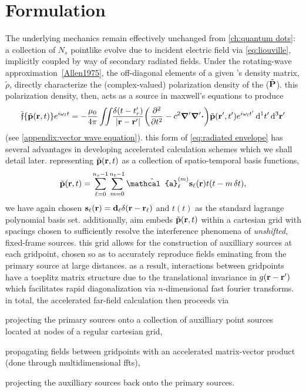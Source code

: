 \section{Formulation}

The underlying mechanics remain effectively unchanged from \cref{ch:quantum dots}: a collection of $N_s$ pointlike \qds{} evolve due to incident electric field via \cref{eq:liouville}, implicitly coupled by way of secondary radiated fields.
Under the rotating-wave approximation~\cref{Allen1975}, the off-diagonal elements of a given \qd's density matrix, $\tilde{\rho}$, directly characterize the (complex-valued) polarization density of the \qd{} ($\tilde{\vb{P}}$).
this polarization density, then, acts as a source in maxwell's equations to produce
\begin{equation}
  \tilde{\mathfrak{f}}\qty{\tilde{\vb{p}}(\vb{r}, t)}e^{i \omega_l t} = -\frac{\mu_0}{4\pi} \iint_{} \kern0.1em \frac{\delta(t - t'_r)}{\abs{\vb{r} - \vb{r}'}} \qty(\pdv[2]{t} - c^2 \grad' \grad'\boldsymbol{\cdot}) \tilde{\vb{p}}(\vb{r}', t') e^{i \omega_l t'} \dd[1]{t'} \dd[3]{\vb{r}'}
  \label{eq:envelope propagator}
\end{equation}
(see \cref{appendix:vector wave equation}).
this form of \cref{eq:radiated envelope} has several advantages in developing accelerated calculation schemes which we shall detail later.
representing $\tilde{\vb{p}}(\vb{r}, t)$ as a collection of spatio-temporal basis functions,
\begin{equation}
  \tilde{\vb{p}}(\vb{r}, t) = \sum_{\ell = 0}^{n_s - 1} \sum_{m = 0}^{n_t - 1} \tilde{\mathcal{a}}_\ell^{(m)} \vb{s}_\ell(\vb{r}) t(t - m \, \delta t),
\end{equation}
we have again chosen $\vb{s}_\ell(\vb{r}) = \vb{d}_\ell \delta(\vb{r} - \vb{r}_\ell)$ and $t(t)$ as the standard lagrange polynomial basis set.
additionally, aim embeds $\tilde{\vb{p}}(\vb{r}, t)$ within a cartesian grid with spacings chosen to sufficiently resolve the interference phenomena of \emph{unshifted}, fixed-frame sources.
this grid allows for the construction of auxilliary sources at each gridpoint, chosen so as to accurately reproduce fields eminating from the primary source at large distances.
as a result, interactions between gridpoints have a toeplitz matrix structure due to the translational invariance in $g(\vb{r} - \vb{r}')$ which facilitates rapid diagonalization via $n$-dimensional fast fourier transforms.
in total, the accelerated far-field calculation then proceeds via
\begin{inparaenum}[(i)]
  \item projecting the primary sources onto a collection of auxilliary point sources located at nodes of a regular cartesian grid,
  \item propagating fields between gridpoints with an accelerated matrix-vector product (done through multidimensional ffts),
  \item projecting the auxilliary sources back onto the primary sources.
\end{inparaenum}

